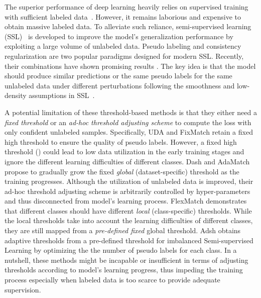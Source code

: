 \documentclass{article} \usepackage{iclr2023_conference,times}
\theoremstyle{plain}
\theoremstyle{definition}
\theoremstyle{remark}
\begin{document}
The superior performance of deep learning heavily relies on supervised training with sufficient labeled data~\citep{he2016deep,vaswani2017attention,dong2018speech}.
However, it remains laborious and expensive to obtain massive labeled data.
To alleviate such reliance, semi-supervised learning (SSL)~\citep{zhu2005semi,zhu2009introduction,sohn2020fixmatch,rosenberg2005semi,gong2016multi,kervadec2019curriculum,dai2017good} is developed to improve the model's generalization performance by exploiting a large volume of unlabeled data.
Pseudo labeling \citep{lee2013pseudo,xie2020self,mclachlan1975iterative,rizve2020defense} and consistency regularization \citep{bachman2014learning,samuli2017temporal,sajjadi2016regularization} are two popular paradigms designed for modern SSL.
Recently, their combinations have shown promising results \citep{xie2020unsupervised,sohn2020fixmatch,pham2021meta,xu2021dash,zhang2021flexmatch}. The key idea is that the model should produce similar predictions or the same pseudo labels for the same unlabeled data under different perturbations following the smoothness and low-density assumptions in SSL~\citep{chapelle2006ssl}.



A potential limitation of these threshold-based methods is that they either need a \textit{fixed threshold} \citep{xie2020unsupervised,sohn2020fixmatch,zhang2021flexmatch,guo2022class} or an \textit{ad-hoc threshold adjusting scheme} \citep{xu2021dash} to compute the loss with only confident unlabeled samples.
Specifically, UDA \citep{xie2020unsupervised} and FixMatch \citep{sohn2020fixmatch} retain a fixed high threshold to ensure the quality of pseudo labels.
However, a fixed high threshold ()  could lead to low data utilization in the early training stages and ignore the different learning difficulties of different classes.
Dash \citep{xu2021dash} and AdaMatch \citep{berthelot2021adamatch} propose to gradually grow the fixed \textit{global} (dataset-specific) threshold as the training progresses.
Although the utilization of unlabeled data is improved, their ad-hoc threshold adjusting scheme is arbitrarily controlled by hyper-parameters and thus disconnected from model's learning process.
FlexMatch \citep{zhang2021flexmatch} demonstrates that different classes should have different \textit{local} (class-specific) thresholds.
While the local thresholds take into account the learning difficulties of different classes, they are still mapped from a \emph{pre-defined fixed} global threshold. Adsh \citep{guo2022class} obtains adaptive thresholds from a pre-defined threshold for imbalanced Semi-supervised Learning by optimizing the the number of pseudo labels for each class. In a nutshell, these methods might be incapable or insufficient in terms of adjusting thresholds according to model's learning progress, thus impeding the training process especially when labeled data is too scarce to provide adequate supervision.
\end{document}
